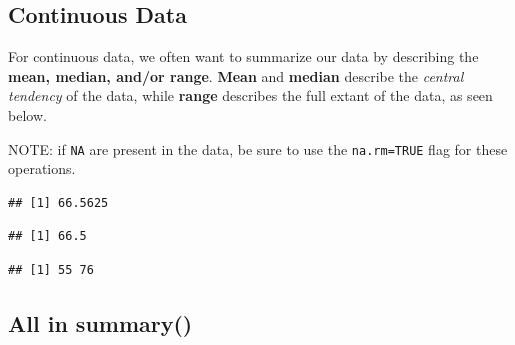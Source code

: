 \documentclass[
]{book}
\newenvironment{Shaded}{\begin{snugshade}}{\end{snugshade}}
\newcommand{\AttributeTok}[1]{\textcolor[rgb]{0.77,0.63,0.00}{#1}}
\newcommand{\FunctionTok}[1]{\textcolor[rgb]{0.00,0.00,0.00}{#1}}
\newcommand{\NormalTok}[1]{#1}
\newcommand{\SpecialCharTok}[1]{\textcolor[rgb]{0.00,0.00,0.00}{#1}}
\begin{document}
\hypertarget{continuous-data}{%
\subsection*{Continuous Data}\label{continuous-data}}

For continuous data, we often want to summarize our data by describing the \textbf{mean, median, and/or range}. \textbf{Mean} and \textbf{median} describe the \emph{central tendency} of the data, while \textbf{range} describes the full extant of the data, as seen below.

NOTE: if \texttt{NA} are present in the data, be sure to use the \texttt{na.rm=TRUE} flag for these operations.

\begin{Shaded}
\end{Shaded}

\begin{verbatim}
## [1] 66.5625
\end{verbatim}

\begin{Shaded}
\end{Shaded}

\begin{verbatim}
## [1] 66.5
\end{verbatim}

\begin{Shaded}
\end{Shaded}

\begin{verbatim}
## [1] 55 76
\end{verbatim}

\hypertarget{all-in-summary}{%
\subsection*{All in summary()}\label{all-in-summary}}
\end{document}
